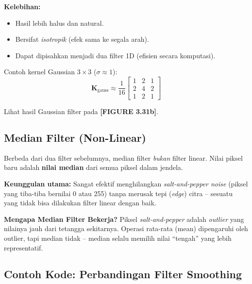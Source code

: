 \documentclass[12pt,a4paper]{article}
\begin{document}
\textbf{Kelebihan:}
\begin{itemize}
  \item Hasil lebih halus dan natural.
  \item Bersifat \textit{isotropik} (efek sama ke segala arah).
  \item Dapat dipisahkan menjadi dua filter 1D (efisien secara komputasi).
\end{itemize}

Contoh kernel Gaussian $3\times3$ ($\sigma \approx 1$):
\begin{equation}
  \mathbf{K}_{\text{gauss}} \approx \frac{1}{16}
  \begin{bmatrix}
    1 & 2 & 1 \\
    2 & 4 & 2 \\
    1 & 2 & 1
  \end{bmatrix}
  \label{eq:gaussian_kernel_example}
\end{equation}

Lihat hasil Gaussian filter pada \textbf{[FIGURE 3.31b]}.

\subsection{Median Filter (Non-Linear)}

Berbeda dari dua filter sebelumnya, median filter \textit{bukan} filter linear. Nilai piksel baru adalah \textbf{nilai median} dari semua piksel dalam jendela.

\textbf{Keunggulan utama:} Sangat efektif menghilangkan \textit{salt-and-pepper noise} (piksel yang tiba-tiba bernilai 0 atau 255) tanpa merusak tepi (\textit{edge}) citra -- sesuatu yang tidak bisa dilakukan filter linear dengan baik.

\begin{tipbox}
\textbf{Mengapa Median Filter Bekerja?} Piksel \textit{salt-and-pepper} adalah \textit{outlier} yang nilainya jauh dari tetangga sekitarnya. Operasi rata-rata (mean) dipengaruhi oleh outlier, tapi median tidak -- median selalu memilih nilai ``tengah'' yang lebih representatif.
\end{tipbox}

\subsection{Contoh Kode: Perbandingan Filter Smoothing}
\end{document}
